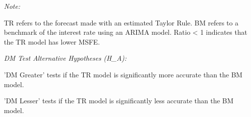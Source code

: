 \begin{table}
{\begin{threeparttable}
\begin{tabular}[t]{>{}r|rrr>{}l>{}l>{}l}
\bottomrule
\end{tabular}
\begin{tablenotes}[para]
\item \textit{Note:} 
\item TR refers to the forecast made with an estimated Taylor Rule. BM refers to a benchmark of the interest rate using an ARIMA model. Ratio < 1 indicates that the TR model has lower MSFE.
\item \textit{DM Test Alternative Hypotheses (H\_A):} 
\item[*] 'DM Greater' tests if the TR model is significantly more accurate than the BM model.
\item[\dag] 'DM Lesser' tests if the TR model is significantly less accurate than the BM model.
\end{tablenotes}
\end{threeparttable}}
\end{table}
